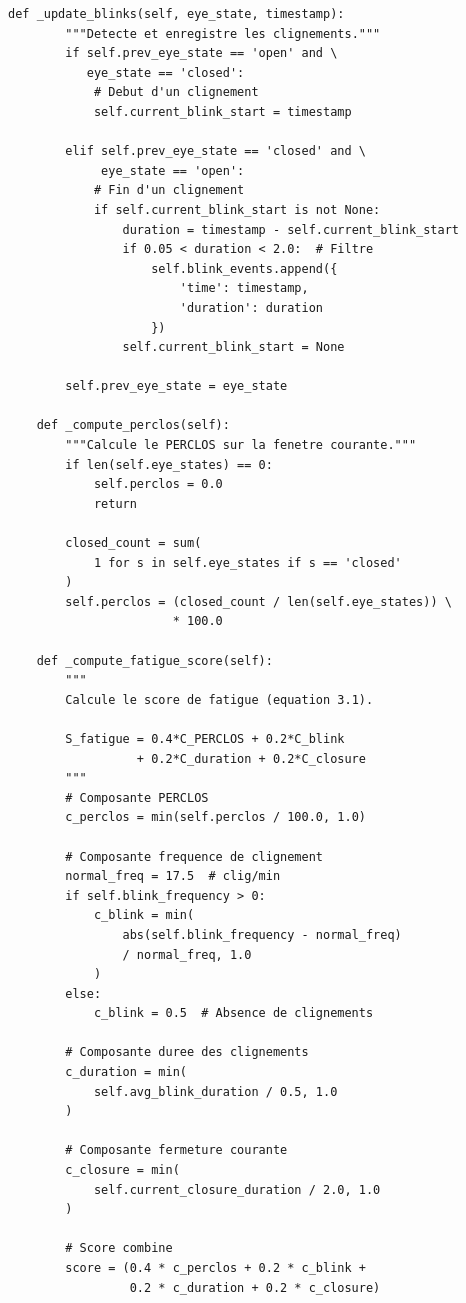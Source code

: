 \begin{lstlisting}[style=pythonstyle, caption={Module d'analyse comportementale.}, label={lst:behavioral}]
    def _update_blinks(self, eye_state, timestamp):
        """Detecte et enregistre les clignements."""
        if self.prev_eye_state == 'open' and \
           eye_state == 'closed':
            # Debut d'un clignement
            self.current_blink_start = timestamp
        
        elif self.prev_eye_state == 'closed' and \
             eye_state == 'open':
            # Fin d'un clignement
            if self.current_blink_start is not None:
                duration = timestamp - self.current_blink_start
                if 0.05 < duration < 2.0:  # Filtre
                    self.blink_events.append({
                        'time': timestamp,
                        'duration': duration
                    })
                self.current_blink_start = None
        
        self.prev_eye_state = eye_state
    
    def _compute_perclos(self):
        """Calcule le PERCLOS sur la fenetre courante."""
        if len(self.eye_states) == 0:
            self.perclos = 0.0
            return
        
        closed_count = sum(
            1 for s in self.eye_states if s == 'closed'
        )
        self.perclos = (closed_count / len(self.eye_states)) \
                       * 100.0
    
    def _compute_fatigue_score(self):
        """
        Calcule le score de fatigue (equation 3.1).
        
        S_fatigue = 0.4*C_PERCLOS + 0.2*C_blink 
                  + 0.2*C_duration + 0.2*C_closure
        """
        # Composante PERCLOS
        c_perclos = min(self.perclos / 100.0, 1.0)
        
        # Composante frequence de clignement
        normal_freq = 17.5  # clig/min
        if self.blink_frequency > 0:
            c_blink = min(
                abs(self.blink_frequency - normal_freq) 
                / normal_freq, 1.0
            )
        else:
            c_blink = 0.5  # Absence de clignements
        
        # Composante duree des clignements
        c_duration = min(
            self.avg_blink_duration / 0.5, 1.0
        )
        
        # Composante fermeture courante
        c_closure = min(
            self.current_closure_duration / 2.0, 1.0
        )
        
        # Score combine
        score = (0.4 * c_perclos + 0.2 * c_blink + 
                 0.2 * c_duration + 0.2 * c_closure)
        

\end{lstlisting}
